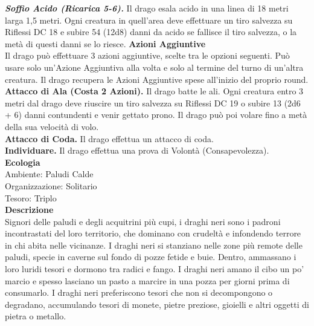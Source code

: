 \begin{multicols}{2}
\emph{\textbf{Soffio Acido (Ricarica 5-6).}} Il drago esala acido in una linea di 18 metri larga 1,5 metri. Ogni creatura in quell'area deve effettuare un tiro salvezza su Riflessi DC 18 e subire 54 (12d8) danni da acido se fallisce il tiro salvezza, o la metà di questi danni se lo riesce. 
\textbf{Azioni Aggiuntive}\\
Il drago può effettuare 3 azioni aggiuntive, scelte tra le opzioni seguenti. Può usare solo un'Azione Aggiuntiva alla volta e solo al termine del turno di un'altra creatura. Il drago recupera le Azioni Aggiuntive spese all'inizio del proprio round.\\
\textbf{Attacco di Ala (Costa 2 Azioni).} Il drago batte le ali. Ogni creatura entro 3 metri dal drago deve riuscire un tiro salvezza su Riflessi DC 19 o subire 13 (2d6 + 6) danni contundenti e venir gettato prono. Il drago può poi volare fino a metà della sua velocità di volo.\\
\textbf{Attacco di Coda.} Il drago effettua un attacco di coda.\\
\textbf{Individuare.} Il drago effettua una prova di Volontà (Consapevolezza).\\
\textbf{Ecologia}\\
Ambiente: Paludi Calde\\
Organizzazione: Solitario\\
Tesoro: Triplo\\
\textbf{Descrizione}\\
Signori delle paludi e degli acquitrini più cupi, i draghi neri sono i padroni incontrastati del loro territorio, che dominano con crudeltà e infondendo terrore in chi abita nelle vicinanze. I draghi neri si stanziano nelle zone più remote delle paludi, specie in caverne sul fondo di pozze fetide e buie. Dentro, ammassano i loro luridi tesori e dormono tra radici e fango. I draghi neri amano il cibo un po’ marcio e spesso lasciano un pasto a marcire in una pozza per giorni prima di consumarlo. I draghi neri preferiscono tesori che non si decompongono o degradano, accumulando tesori di monete, pietre preziose, gioielli e altri oggetti di pietra o metallo.\\


\end{multicols}
